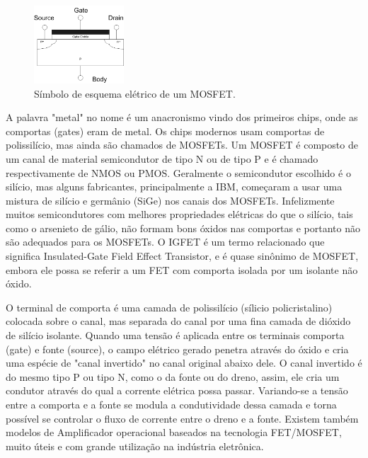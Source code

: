 \documentclass[12pt]{article}
\begin{document}
        \begin{figure}[htpb!]
            
            \centering
            \includegraphics[width=0.3\textwidth]{./images/FET_cross_section.png}
            \caption{Símbolo de esquema elétrico de um MOSFET.}

        \end{figure}

    A palavra "metal" no nome é um anacronismo vindo dos primeiros chips, onde as comportas (gates) eram de metal. Os chips modernos usam comportas de polissilício, mas ainda são chamados de MOSFETs. Um MOSFET é composto de um canal de material semicondutor de tipo N ou de tipo P e é chamado respectivamente de NMOS ou PMOS. Geralmente o semicondutor escolhido é o silício, mas alguns fabricantes, principalmente a IBM, começaram a usar uma mistura de silício e germânio (SiGe) nos canais dos MOSFETs. Infelizmente muitos semicondutores com melhores propriedades elétricas do que o silício, tais como o arsenieto de gálio, não formam bons óxidos nas comportas e portanto não são adequados para os MOSFETs. O IGFET é um termo relacionado que significa Insulated-Gate Field Effect Transistor, e é quase sinônimo de MOSFET, embora ele possa se referir a um FET com comporta isolada por um isolante não óxido.

    O terminal de comporta é uma camada de polissilício (sílicio policristalino) colocada sobre o canal, mas separada do canal por uma fina camada de dióxido de silício isolante. Quando uma tensão é aplicada entre os terminais comporta (gate) e fonte (source), o campo elétrico gerado penetra através do óxido e cria uma espécie de "canal invertido" no canal original abaixo dele. O canal invertido é do mesmo tipo P ou tipo N, como o da fonte ou do dreno, assim, ele cria um condutor através do qual a corrente elétrica possa passar. Variando-se a tensão entre a comporta e a fonte se modula a condutividade dessa camada e torna possível se controlar o fluxo de corrente entre o dreno e a fonte. Existem também modelos de Amplificador operacional baseados na tecnologia FET/MOSFET, muito úteis e com grande utilização na indústria eletrônica.
\end{document}
